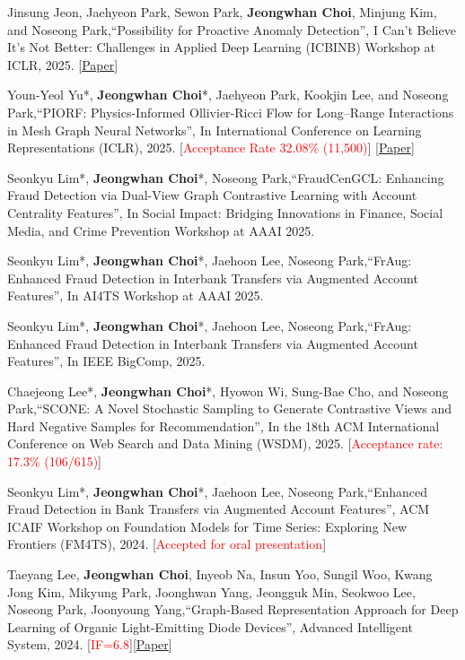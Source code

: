 \documentclass[10pt]{article}
\newenvironment{changemargin}[2]{
  \begin{list}{}{
    \setlength{\topsep}{0pt}
    \setlength{\leftmargin}{#1}
    \setlength{\rightmargin}{#2}
    \setlength{\listparindent}{\parindent}
    \setlength{\itemindent}{\parindent}
    \setlength{\parsep}{\parskip}
  }
  \item[]}{\end{list}
}
\newcommand{\presentation}[2]{
	{#1} \hfill \emph{#2}\\ \bigskip
}
\newcommand{\RED}[1]{\textcolor{red}{#1}}
\newenvironment{body} {
	\vspace*{-16pt}
	\begin{changemargin}{-0.25in}{-0.5in}
  }
	{\end{changemargin}
}
\begin{document}
\begin{body}
	\vspace{14pt}

\presentation{
Jinsung Jeon, Jaehyeon Park, Sewon Park, \textbf{Jeongwhan Choi}, Minjung Kim, and Noseong Park,``Possibility for Proactive Anomaly Detection'', I Can't Believe It's Not Better: Challenges in Applied Deep Learning (ICBINB) Workshop at ICLR, 2025. [\href{https://openreview.net/forum?id=w63aCqNRFp}{Paper}]}{}

\presentation{
Youn-Yeol Yu*, \textbf{Jeongwhan Choi}*, Jaehyeon Park, Kookjin Lee, and Noseong Park,``PIORF: Physics-Informed Ollivier-Ricci Flow for Long–Range Interactions in Mesh Graph Neural Networks'', In International Conference on Learning Representations (ICLR), 2025. [\RED{Acceptance Rate 32.08\% (11,500)}] [\href{https://openreview.net/forum?id=qkBBHixPow}{Paper}]}{}

 \presentation{
Seonkyu Lim*, \textbf{Jeongwhan Choi}*, Noseong Park,``FraudCenGCL: Enhancing Fraud Detection via Dual-View Graph Contrastive Learning with Account Centrality Features'', In Social Impact: Bridging Innovations in Finance, Social Media, and Crime Prevention Workshop at AAAI 2025.}{}

 \presentation{
Seonkyu Lim*, \textbf{Jeongwhan Choi}*, Jaehoon Lee, Noseong Park,``FrAug: Enhanced Fraud Detection in Interbank Transfers via Augmented Account Features'', In AI4TS Workshop at AAAI 2025.}{}

 \presentation{
Seonkyu Lim*, \textbf{Jeongwhan Choi}*, Jaehoon Lee, Noseong Park,``FrAug: Enhanced Fraud Detection in Interbank Transfers via Augmented Account Features'', In IEEE BigComp, 2025.}{}

\presentation{
Chaejeong Lee*, \textbf{Jeongwhan Choi}*, Hyowon Wi,  Sung-Bae Cho, and Noseong Park,``SCONE: A Novel Stochastic Sampling to Generate Contrastive Views and Hard Negative Samples for Recommendation'', In the 18th ACM International Conference on Web Search and Data Mining (WSDM), 2025. [\RED{Acceptance rate: 17.3\% (106/615)}]}{}

\presentation{
Seonkyu Lim*, \textbf{Jeongwhan Choi}*, Jaehoon Lee, Noseong Park,``Enhanced Fraud Detection in Bank Transfers via Augmented Account Features'', ACM ICAIF Workshop on Foundation Models for Time Series: Exploring New Frontiers (FM4TS), 2024. [\RED{Accepted for oral presentation}]}{}

\presentation{
Taeyang Lee, \textbf{Jeongwhan Choi}, Inyeob Na, Insun Yoo, Sungil Woo, Kwang Jong Kim, Mikyung Park, Joonghwan Yang, Jeongguk Min, Seokwoo Lee, Noseong Park, Joonyoung Yang,``Graph-Based Representation Approach for Deep Learning of Organic Light-Emitting Diode Devices'', Advanced Intelligent System, 2024. [\RED{IF=6.8}][\href{https://onlinelibrary.wiley.com/doi/10.1002/aisy.202400598}{Paper}]}{}


\end{body}
\end{document}
